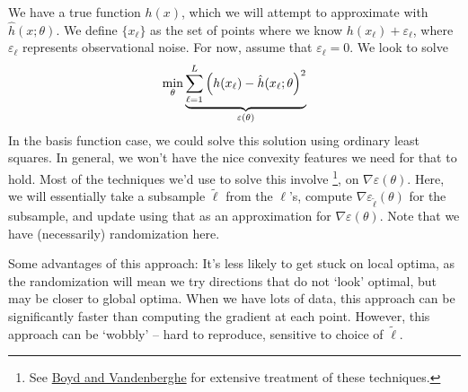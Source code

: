 \documentclass[10pt]{article}
\begin{document}
\begin{model}
	We have a true function $h(x)$, which we will attempt to approximate with $\hat{h}(x;\theta)$. We define $\{x_\ell\}$ as the set of points where we know $h(x_\ell) + \varepsilon_\ell$, where $\varepsilon_\ell$ represents observational noise. For now, assume that $\varepsilon_\ell = 0$. We look to solve
	\[
	\min_{\theta} \underbrace{\sum_{\ell = 1}^L \left( h(x_\ell) - \hat{h}(x_\ell;\theta\right)^2}_{\varepsilon(\theta)}
	\]
	In the basis function case, we could solve this solution using ordinary least squares. In general, we won't have the nice convexity features we need for that to hold. Most of the techniques we'd use to solve this involve \footnote{See \href{https://web.stanford.edu/~boyd/cvxbook/}{Boyd and Vandenberghe} for extensive treatment of these techniques.}, on $\nabla \varepsilon(\theta)$. Here, we will essentially take a subsample $\tilde{\ell}$ from the $\ell$'s, compute $\nabla \varepsilon_{\tilde{\ell}}(\theta)$ for the subsample, and update using that as an approximation for $\nabla \varepsilon(\theta)$. Note that we have (necessarily) randomization here. 
	
	\begin{remark}
		Some advantages of this approach: It's less likely to get stuck on local optima, as the randomization will mean we try directions that do not `look' optimal, but may be closer to global optima. When we have lots of data, this approach can be significantly faster than computing the gradient at each point. However, this approach can be `wobbly' -- hard to reproduce, sensitive to choice of $\tilde{\ell}$. 
	\end{remark}
\end{model}
\end{document}
